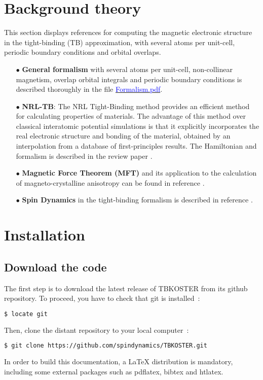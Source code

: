 \documentclass[12pt, onecolumn]{memoir}
\begin{document}
\mainmatter

\chapter{Background theory}

This section displays references for computing the magnetic electronic structure in the tight-binding (TB) approximation, with several atoms per unit-cell, periodic boundary conditions and orbital overlaps.

\begin{itemize}
  \item[$\bullet$]{\textbf{General formalism} with several atoms per unit-cell, non-collinear magnetism, overlap orbital integrals and periodic boundary conditions is described thoroughly in the file \href{https://fr.overleaf.com/read/hvmmbjspmtcg#e8c298}{\textcolor{blue}{Formalism.pdf}}.}
  \item[$\bullet$]{\textbf{NRL-TB}: The NRL Tight-Binding method provides an efficient method for calculating properties of materials. The advantage of this method over classical interatomic potential simulations is that it explicitly incorporates the real electronic structure and bonding of the material, obtained by an interpolation from a database of first-principles results. The Hamiltonian and formalism is described in the review paper \cite{barreteauEfficientMagneticTightbinding2016}.} 
  \item[$\bullet$]{\textbf{Magnetic Force Theorem (MFT)} and its application to the calculation of magneto-crystalline anisotropy can be found in reference \cite{liMagnetocrystallineAnisotropyEnergy2013}.
  }
  \item[$\bullet$]{\textbf{Spin Dynamics} in the tight-binding formalism is described in reference \cite{cardiasSpinDynamicsConstrained2021}.
  } 
\end{itemize}
\vfil

\chapter{Installation}

\section{Download the code}

The first step is to download the latest release of TBKOSTER from its github repository. To proceed, you have to check that git is installed~:
\begin{lstlisting}[language=bash,basicstyle=\small]
$ locate git
\end{lstlisting}
Then, clone the distant repository to your local computer~:
\begin{lstlisting}[language=bash,basicstyle=\small]
$ git clone https://github.com/spindynamics/TBKOSTER.git
\end{lstlisting}
In order to build this documentation, a LaTeX distribution is mandatory, including some external packages such as pdflatex, bibtex and htlatex.
\end{document}

